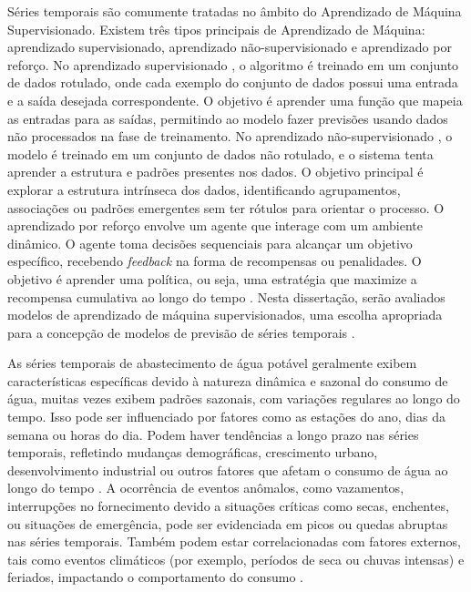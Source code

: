 Séries temporais são comumente tratadas no âmbito do Aprendizado de Máquina Supervisionado. Existem três tipos principais de Aprendizado de Máquina: aprendizado supervisionado, aprendizado não-supervisionado e aprendizado por reforço. No aprendizado supervisionado \cite{LIU2023128730}, o algoritmo é treinado em um conjunto de dados rotulado, onde cada exemplo do conjunto de dados possui uma entrada e a saída desejada correspondente. O objetivo é aprender uma função que mapeia as entradas para as saídas, permitindo ao modelo fazer previsões usando dados não processados na fase de treinamento. No aprendizado não-supervisionado \cite{WANG2022122747}, o modelo é treinado em um conjunto de dados não rotulado, e o sistema tenta aprender a estrutura e padrões presentes nos dados. O objetivo principal é explorar a estrutura intrínseca dos dados, identificando agrupamentos, associações ou padrões emergentes sem ter rótulos para orientar o processo. O aprendizado por reforço \cite{CHEN2023121710} envolve um agente que interage com um ambiente dinâmico. O agente toma decisões sequenciais para alcançar um objetivo específico, recebendo \textit{feedback} na forma de recompensas ou penalidades. O objetivo é aprender uma política, ou seja, uma estratégia que maximize a recompensa cumulativa ao longo do tempo \cite{Silva2021}. Nesta dissertação, serão avaliados modelos de aprendizado de máquina supervisionados, uma escolha apropriada para a concepção de modelos de previsão de séries temporais \cite{UCCASTILLO2023105788}.


As séries temporais de abastecimento de água potável geralmente exibem características específicas devido à natureza dinâmica e sazonal do consumo de água, muitas vezes exibem padrões sazonais, com variações regulares ao longo do tempo. Isso pode ser influenciado por fatores como as estações do ano, dias da semana ou horas do dia. Podem haver tendências a longo prazo nas séries temporais, refletindo mudanças demográficas, crescimento urbano, desenvolvimento industrial ou outros fatores que afetam o consumo de água ao longo do tempo \cite{JI2023129928}. A ocorrência de eventos anômalos, como vazamentos, interrupções no fornecimento devido a situações críticas como secas, enchentes, ou situações de emergência, pode ser evidenciada em picos ou quedas abruptas nas séries temporais. Também podem estar correlacionadas com fatores externos, tais como eventos climáticos (por exemplo, períodos de seca ou chuvas intensas) e feriados, impactando o comportamento do consumo \cite{BERGLUND2023104739}.

